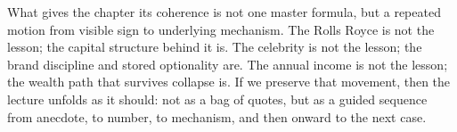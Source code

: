 What gives the chapter its coherence is not one master formula, but a repeated motion from visible sign to underlying mechanism. The Rolls Royce is not the lesson; the capital structure behind it is. The celebrity is not the lesson; the brand discipline and stored optionality are. The annual income is not the lesson; the wealth path that survives collapse is. If we preserve that movement, then the lecture unfolds as it should: not as a bag of quotes, but as a guided sequence from anecdote, to number, to mechanism, and then onward to the next case.